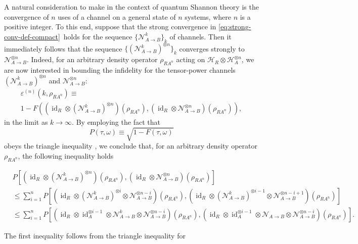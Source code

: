 \documentclass[apsrev,twocolumn]{revtex4-1}%
\begin{document}
A natural consideration to make in the context of quantum Shannon theory is
the convergence of $n$ uses of a channel on a general state of $n$ systems,
where $n$ is a positive integer. To this end, suppose that the strong
convergence in \eqref{eq:strong-conv-def-compact}\ holds for the sequence
$\{\mathcal{N}_{A\rightarrow B}^{k}\}_{k}$ of channels. Then it immediately
follows that the sequence $\{(\mathcal{N}_{A\rightarrow B}^{k})^{\otimes
n}\}_{k}$ converges strongly to $\mathcal{N}_{A\rightarrow B}^{\otimes n}$.
Indeed, for an arbitrary density operator $\rho_{RA^{n}}$ acting on
$\mathcal{H}_{R}\otimes\mathcal{H}_{A}^{\otimes n}$, we are now interested in
bounding the infidelity for the tensor-power channels $(\mathcal{N}%
_{A\rightarrow B}^{k})^{\otimes n}$ and $\mathcal{N}_{A\rightarrow B}^{\otimes
n}$:%
\begin{multline}
\varepsilon^{(n)}(k,\rho_{RA^{n}})\equiv\\
1-F((\operatorname{id}_{R}\otimes(\mathcal{N}_{A\rightarrow B}^{k})^{\otimes
n})(\rho_{RA^{n}}),(\operatorname{id}_{R}\otimes\mathcal{N}_{A\rightarrow
B}^{\otimes n})(\rho_{RA^{n}})),
\end{multline}
in the limit as $k\rightarrow\infty$. By employing the fact that
\begin{equation}
P(\tau,\omega)\equiv\sqrt{1-F(\tau,\omega)}%
\end{equation}
obeys the triangle inequality \cite{R02,R03,GLN04,R06}, we conclude that, for
an arbitrary density operator $\rho_{RA^{n}}$, the following inequality holds
\begin{widetext}
\begin{align}
& P\left[  (\operatorname{id}_{R}\otimes(\mathcal{N}_{A\rightarrow B}%
^{k})^{\otimes n})(\rho_{RA^{n}}),(\operatorname{id}_{R}\otimes\mathcal{N}%
_{A\rightarrow B}^{\otimes n})(\rho_{RA^{n}})\right]
\nonumber\\
& \leq\sum_{i=1}^{n}P\left[  (\operatorname{id}_{R}\otimes(\mathcal{N}%
_{A\rightarrow B}^{k})^{\otimes i}\otimes\mathcal{N}_{A\rightarrow B}^{\otimes
n-i})(\rho_{RA^{n}}),(\operatorname{id}_{R}\otimes(\mathcal{N}_{A\rightarrow
B}^{k})^{\otimes i-1}\otimes\mathcal{N}_{A\rightarrow B}^{\otimes
n-i+1})(\rho_{RA^{n}})\right]
\label{eq:tensor-power-bnd-1}\\
& \leq\sum_{i=1}^{n}P\left[  (\operatorname{id}_{R}\otimes\operatorname{id}%
_{A}^{\otimes  i-1  }\otimes\mathcal{N}_{A\rightarrow B}%
^{k}\otimes\mathcal{N}_{A\rightarrow B}^{\otimes n-i})(\rho_{RA^{n}%
}),(\operatorname{id}_{R}\otimes\operatorname{id}_{A}^{\otimes
i-1  }\otimes\mathcal{N}_{A\rightarrow B}\otimes\mathcal{N}%
_{A\rightarrow B}^{\otimes n-i})(\rho_{RA^{n}})\right]
.\label{eq:tensor-power-bnd-3}%
\end{align}
\end{widetext}The first inequality follows from the triangle inequality for
\end{document}
